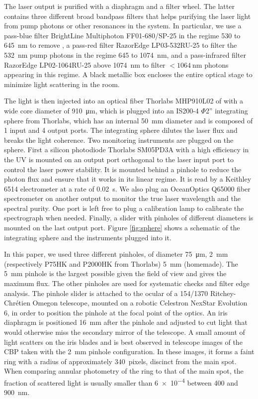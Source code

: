The laser output is purified with a diaphragm and a filter wheel. The latter contains three different broad bandpass filters that helps purifying the laser light from pump photons or other resonances in the system. In particular, we use a pass-blue filter BrightLine Multiphoton FF01-680/SP-25 in the regime 530 to \SI{645}{\nano\meter} to remove , a pass-red filter RazorEdge LP03-532RU-25 to filter the \SI{532}{\nano\meter} pump photons in the regime 645 to \SI{1074}{\nano\meter}, and a pass-infrared filter RazorEdge LP02-1064RU-25 above \SI{1074}{\nano\meter} to filter $<\SI{1064}{\nano\meter}$ photons appearing in this regime. A black metallic box encloses the entire optical stage to minimize light scattering in the room.

The light is then injected into an optical fiber Thorlabs MHP910L02 of with a wide core diameter of \SI{910}{\micro\meter}, which is plugged into an IS200-4 $\Phi$2'' integrating sphere from Thorlabs, which has an internal \SI{50}{\mm} diameter and is composed of 1 input and 4 output ports. The integrating sphere dilutes the laser flux and breaks the light coherence. Two monitoring instruments are plugged on the sphere. First a silicon photodiode Thorlabs SM05PD3A with a high efficiency in the UV is mounted on an output port orthogonal to the laser input port to control the laser power stability. It is mounted behind a pinhole to reduce the photon flux and ensure that it works in its linear regime. It is read by a Keithley 6514 electrometer at a rate of \SI{0.02}{\second}. We also plug an OceanOptics Q65000 fiber spectrometer on another output to monitor the true laser wavelength and the spectral purity. One port is left free to plug a calibration lamp to calibrate the spectrograph when needed. Finally, a slider with pinholes of different diameters is mounted on the last output port. Figure \ref{fig:sphere} shows a schematic of the integrating sphere and the instruments plugged into it.

In this paper, we used three different pinholes, of diameter \SI{75}{\micro\meter}, \SI{2}{\milli\meter} (respectively P75HK and P2000HK from Thorlabs) \SI{5}{\milli\meter} (homemade). The \SI{5}{\mm} pinhole is the largest possible given the \SD field of view and gives the maximum flux. The other pinholes are used for systematic checks and filter edge analysis. The pinhole slider is attached to the ocular of a 154/1370 Ritchey-Chrétien Omegon telescope, mounted on a robotic Celestron NexStar Evolution 6, in order to position the pinhole at the focal point of the optics. An iris diaphragm is positioned \SI{16}{mm} after the pinhole and adjusted to cut light that would otherwise miss the secondary mirror of the telescope. A small amount of light scatters on the iris blades and is best observed in telescope images of the CBP taken with the \SI{2}{mm} pinhole configuration. In these images, it forms a faint ring with a radius of approximately \SI{340}{pixels}, discinct from the main spot. When comparing annular photometry of the ring to that of the main spot, the fraction of scattered light is usually smaller than \num{6e-4} between 400 and \SI{900}{nm}.

